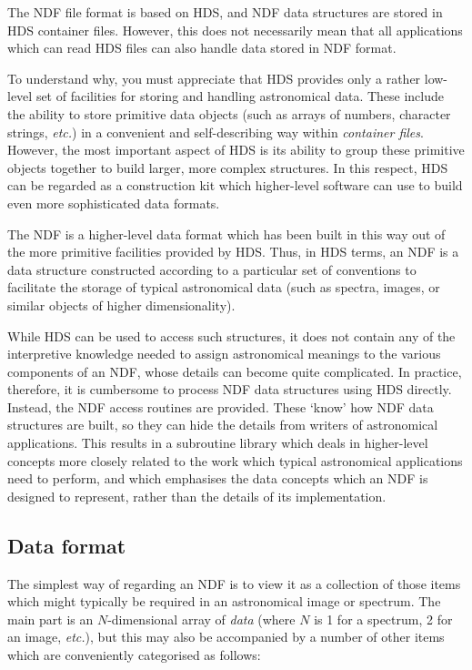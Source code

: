The NDF file format is based on HDS, and NDF data structures are stored in HDS
container files.
However, this does not necessarily mean that all applications which can read
HDS files can also handle data stored in NDF format.

To understand why, you must appreciate that HDS provides only a rather low-level
set of facilities for storing and handling astronomical data.
These include the ability to store primitive data objects (such as arrays of
numbers, character strings, {\em etc.}) in a convenient and self-describing
way within {\em container files}.
However, the most important aspect of HDS is its ability to group these
primitive objects together to build larger, more complex structures.
In this respect, HDS can be regarded as a construction kit which higher-level
software can use to build even more sophisticated data formats.

The NDF is a higher-level data format which has been built in this way out of
the more primitive facilities provided by HDS.
Thus, in HDS terms, an NDF is a data structure constructed according to a
particular set of conventions to facilitate the storage of typical
astronomical data (such as spectra, images, or similar objects of higher
dimensionality).

While HDS can be used to access such structures, it does not contain any of
the interpretive knowledge needed to assign astronomical meanings to the
various components of an NDF, whose details can become quite complicated.
In practice, therefore, it is cumbersome to process NDF data structures using
HDS directly.
Instead, the NDF access routines are provided.
These `know' how NDF data structures are built, so they can hide the details
from writers of astronomical applications.
This results in a subroutine library which deals in higher-level concepts
more closely related to the work which typical astronomical applications
need to perform, and which emphasises the data concepts which an NDF is
designed to represent, rather than the details of its implementation.

\subsection{Data format}

The simplest way of regarding an NDF is to view it as a collection of those
items which might typically be required in an astronomical image or spectrum.
The main part is an $N$-dimensional array of {\em data\/} (where $N$ is 1 for a
spectrum, 2 for an image, {\em etc.}), but this may also be accompanied by a
number of other items which are conveniently categorised as follows:

